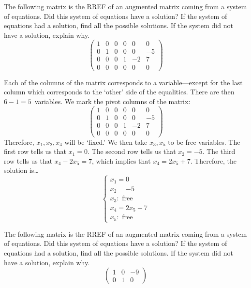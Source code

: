 \documentclass[11pt,letterpaper]{article}
\begin{document}
\newpage



 The following matrix is the RREF of an augmented matrix coming from a system of equations. Did this system of equations have a solution? If the system of equations had a solution, find all the possible solutions. If the system did not have a solution, explain why. 
	\[
	\begin{pmatrix}
	1 & 0 & 0 & 0 & 0 & 0 \\
	0 & 1 & 0 & 0 & 0 & -5 \\
	0 & 0 & 0 & 1 & -2 & 7 \\
	0 & 0 & 0 & 0 & 0 & 0 
	\end{pmatrix}
	\] \pspace

\sol Each of the columns of the matrix corresponds to a variable---except for the last column which corresponds to the `other' side of the equalities. There are then $6 - 1= 5$~variables. We mark the pivot columns of the matrix: 
	\[
	\begin{pmatrix}
	\boxed{1} & 0 & 0 & 0 & 0 & 0 \\
	0 & \boxed{1} & 0 & 0 & 0 & -5 \\
	0 & 0 & 0 & \boxed{1} & -2 & 7 \\
	0 & 0 & 0 & 0 & 0 & 0 
	\end{pmatrix}
	\]
Therefore, $x_1, x_2, x_4$ will be `fixed.' We then take $x_3, x_5$ to be free variables. The first row tells us that $x_1= 0$. The second row tells us that $x_2= -5$. The third row tells us that $x_4 - 2x_5= 7$, which implies that $x_4= 2x_5 + 7$. Therefore, the solution is\dots
	\[
	\begin{cases}
	x_1= 0 \\
	x_2= -5 \\
	x_3 \colon \text{ free} \\
	x_4= 2x_5 + 7 \\
	x_5 \colon \text{ free}
	\end{cases}
	\]



\newpage



 The following matrix is the RREF of an augmented matrix coming from a system of equations. Did this system of equations have a solution? If the system of equations had a solution, find all the possible solutions. If the system did not have a solution, explain why. 
	\[
	\begin{pmatrix}
	1 & 0 & -9 \\
	0 & 1 & 0 
	\end{pmatrix}
	\] \pspace
\end{document}
